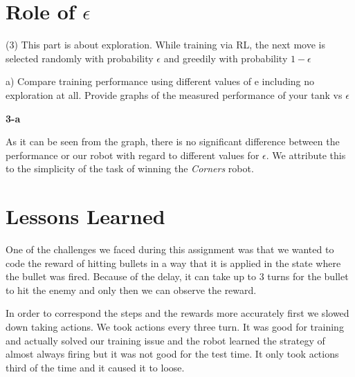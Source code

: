 \documentclass[a4paper,12pt]{article}
\begin{document}
\pagebreak
\section{Role of $\epsilon$}
(3) This part is about exploration. While training via RL, the next move is selected randomly with probability $\epsilon$ and greedily with probability $1 - \epsilon$


a) Compare training performance using different values of e including no exploration at all. Provide graphs of the measured performance of your tank vs $\epsilon$
\begin{center}

\textbf{3-a}
\end{center}
As it can be seen from the graph, there is no significant difference between the performance or our robot with regard to different values for $\epsilon$. We attribute this to the simplicity of the task of winning the \emph{Corners} robot. 

\pagebreak
\section{Lessons Learned}
One of the challenges we faced during this assignment was that we wanted to code the reward of hitting bullets in a way that it is applied in the state where the bullet was fired. Because of the delay, it can take up to 3 turns for the bullet to hit the enemy and only then we can observe the reward.

In order to correspond the steps and the rewards more accurately first we slowed down taking actions. We took actions every three turn. It was good for training and actually solved our training issue and the robot learned the strategy of almost always firing but it was not good for the test time. It only took actions third of the time and it caused it to loose. 
\end{document}
